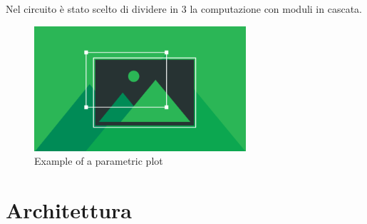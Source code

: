 \documentclass{article}
\begin{document}
Nel circuito è stato scelto di dividere in 3 la computazione con moduli in cascata.

\begin{figure}[h]
\centering
\includegraphics[width=0.7\textwidth]{introduzioneimg1.png}
\caption{Example of a parametric plot}
\end{figure}
\break

\section{Architettura}
\end{document}
